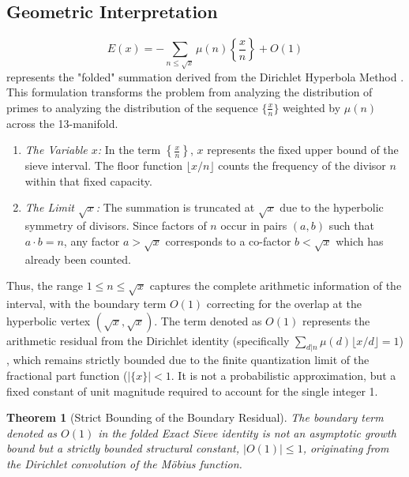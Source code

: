 \documentclass[sn-mathphys-num, pdflatex]{sn-jnl}
\newtheorem{theorem}{Theorem}[section]
\begin{document}
\subsection{Geometric Interpretation}
\label{Geometric Interpretation}
\begin{equation}
E(x) = - \sum_{n \le \sqrt{x}} \mu(n) \left\{ \frac{x}{n} \right\} + O(1)
\end{equation}
represents the "folded" summation derived from the Dirichlet Hyperbola Method \cite{apostol}.
This formulation transforms the problem from analyzing the distribution of primes to analyzing the distribution of the sequence $\{\frac{x}{n}\}$ weighted by $\mu(n)$ across the 13-manifold.
\begin{enumerate}
    \item \textit{The Variable $x$:} In the term $\left\{ \frac{x}{n} \right\}$, $x$ represents the fixed upper bound of the sieve interval. The floor function $\lfloor x/n \rfloor$ counts the frequency of the divisor $n$ within that fixed capacity.
    \item \textit{The Limit $\sqrt{x}$:} The summation is truncated at $\sqrt{x}$ due to the hyperbolic symmetry of divisors. Since factors of $n$ occur in pairs $(a, b)$ such that $a \cdot b = n$, any factor $a > \sqrt{x}$ corresponds to a co-factor $b < \sqrt{x}$ which has already been counted.
\end{enumerate}
Thus, the range $1 \le n \le \sqrt{x}$ captures the complete arithmetic information of the interval, with the boundary term $O(1)$ correcting for the overlap at the hyperbolic vertex $(\sqrt{x}, \sqrt{x})$.
The term denoted as $O(1)$ represents the arithmetic residual from the Dirichlet identity (specifically $\sum_{d|n} \mu(d) \lfloor x/d \rfloor = 1$) \cite{apostol}, which remains strictly bounded due to the finite quantization limit of the fractional part function ($|\{x\}| < 1$. It is not a probabilistic approximation, but a fixed constant of unit magnitude required to account for the single integer 1.

\begin{theorem}[Strict Bounding of the Boundary Residual]
The boundary term denoted as $O(1)$ in the folded Exact Sieve identity is not an asymptotic growth bound but a strictly bounded structural constant, $|O(1)| \le 1$, originating from the Dirichlet convolution of the M\"{o}bius function.
\end{theorem}
\end{document}
